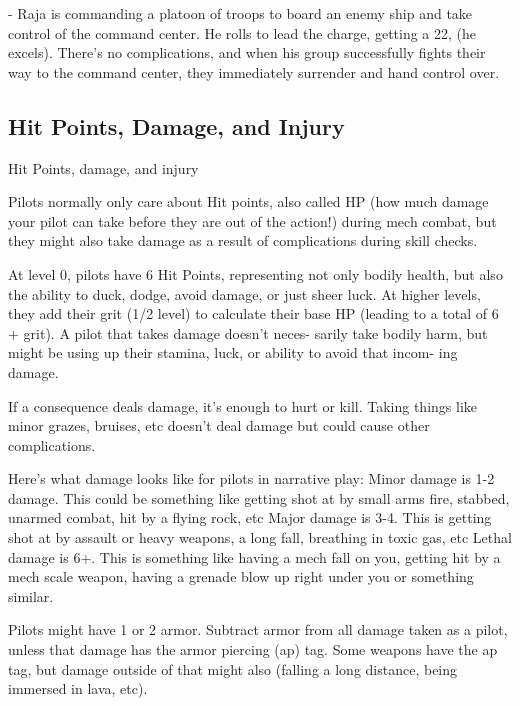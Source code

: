 	        - Raja is commanding a platoon of troops to board an enemy ship and take control of the  
command center. He rolls to lead the charge, getting a 22, (he excels). There’s no complications,  
and when his group successfully fights their way to the command center, they immediately  
surrender and hand control over.  

                                                                                                                    
\subsection{Hit Points, Damage, and Injury}

                                 Hit Points, damage, and injury 

Pilots normally only care about Hit points, also called HP (how much damage your pilot can take 
before they are out of the action!) during mech combat, but they might also take damage as a 
result of complications during skill checks. 

At level 0, pilots have 6 Hit Points, representing not only bodily health, but also the ability to 
duck, dodge, avoid damage, or just sheer luck. At higher levels, they add their grit (1/2 level) to  
calculate their base HP (leading to a total of 6 + grit). A pilot that takes damage doesn’t neces- 
sarily take bodily harm, but might be using up their stamina, luck, or ability to avoid that incom- 
ing damage. 

If a consequence deals damage, it’s enough to hurt or kill. Taking things like minor grazes, 
bruises, etc doesn’t deal damage but could cause other complications. 

Here’s what damage looks like for pilots in narrative play: 
Minor damage is 1-2 damage. This could be something like getting shot at by small arms fire, 
stabbed, unarmed combat, hit by a flying rock, etc 
Major damage is 3-4. This is getting shot at by assault or heavy weapons, a long fall, breathing 
in toxic gas, etc 
Lethal damage is 6+. This is something like having a mech fall on you, getting hit by a mech 
scale weapon, having a grenade blow up right under you or something similar. 

Pilots might have 1 or 2 armor. Subtract armor from all damage taken as a pilot, unless that 
damage has the armor piercing (ap) tag. Some weapons have the ap tag, but damage outside of 
that might also (falling a long distance, being immersed in lava, etc). 

